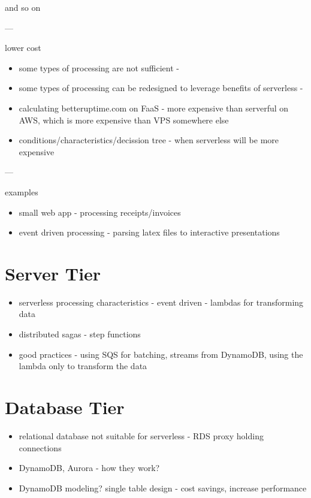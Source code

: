 and so on

---

lower cost

\begin{itemize}
    \item some types of processing are not sufficient - \cite{BerkeleyServerless}
    \item some types of processing can be redesigned to leverage benefits of serverless - \cite{BerkeleyServerless}
    \item calculating betteruptime.com on FaaS - more expensive than serverful on AWS, which is more expensive than VPS somewhere else
    \item conditions/characteristics/decission tree - when serverless will be more expensive
\end{itemize}

---

examples

\begin{itemize}
    \item small web app - processing receipts/invoices
    \item event driven processing - parsing latex files to interactive presentations
\end{itemize}

\section{Server Tier}

\begin{itemize}
    \item serverless processing characteristics - event driven - lambdas for transforming data
    \item distributed sagas - step functions
    \item good practices - using SQS for batching, streams from DynamoDB, using the lambda only to transform the data
\end{itemize}

\section{Database Tier}

\begin{itemize}
    \item relational database not suitable for serverless - RDS proxy holding connections
    \item DynamoDB, Aurora - how they work?
    \item DynamoDB modeling? single table design - cost savings, increase performance
\end{itemize}

